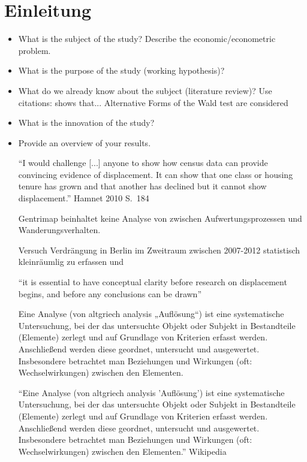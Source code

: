 \section{Einleitung}

\begin{itemize}

    \item What is the subject of the study? Describe the
        economic/econometric problem.
    \item What is the purpose of the study (working hypothesis)?
    \item What do we already know about the subject (literature
        review)? Use citations: shows that...
        Alternative Forms of the Wald test are considered
    \item What is the innovation of the study?
    \item Provide an overview of your results.
    
"`I would challenge [...] anyone to show how census data can provide convincing evidence of displacement. It can show that one class or housing tenure has grown and that another has declined but it cannot show displacement."' Hamnet 2010 S.~184

Gentrimap beinhaltet keine Analyse von zwischen Aufwertungsprozessen und Wanderungsverhalten.

Versuch Verdrängung in Berlin im Zweitraum zwischen 2007-2012 statistisch kleinräumlig zu erfassen und 


"`it is essential to have conceptual clarity before research on displacement begins, and before any conclusions can be drawn"' \citet[S.~304]{Slater2009}

Eine Analyse (von altgriech analysis „Auflösung“) ist eine systematische Untersuchung, bei der das untersuchte Objekt oder Subjekt in Bestandteile (Elemente) zerlegt und auf Grundlage von Kriterien erfasst werden. Anschließend werden diese geordnet, untersucht und ausgewertet. Insbesondere betrachtet man Beziehungen und Wirkungen (oft: Wechselwirkungen) zwischen den Elementen.

"`Eine Analyse (von altgriech analysis 'Auflösung') ist eine systematische Untersuchung, bei der das untersuchte Objekt oder Subjekt in Bestandteile (Elemente) zerlegt und auf Grundlage von Kriterien erfasst werden. Anschließend werden diese geordnet, untersucht und ausgewertet. Insbesondere betrachtet man Beziehungen und Wirkungen (oft: Wechselwirkungen) zwischen den Elementen."' Wikipedia



\end{itemize}
